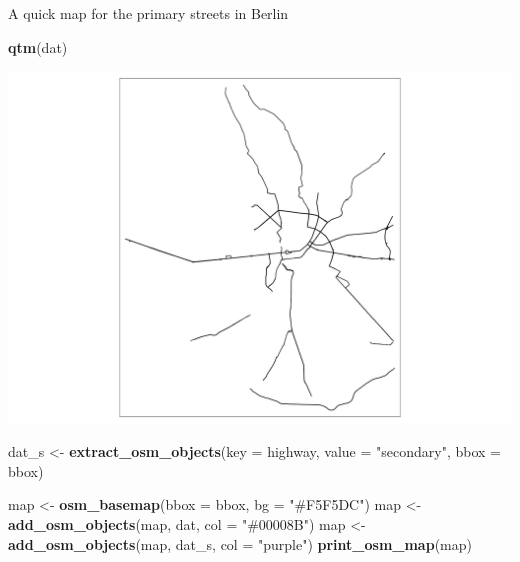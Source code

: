 \documentclass[
  ignorenonframetext,
]{beamer}
\newenvironment{Shaded}{\begin{snugshade}}{\end{snugshade}}
\newcommand{\DataTypeTok}[1]{\textcolor[rgb]{0.13,0.29,0.53}{#1}}
\newcommand{\KeywordTok}[1]{\textcolor[rgb]{0.13,0.29,0.53}{\textbf{#1}}}
\newcommand{\NormalTok}[1]{#1}
\newcommand{\StringTok}[1]{\textcolor[rgb]{0.31,0.60,0.02}{#1}}
\begin{document}
\begin{frame}[fragile]{A quick map for the primary streets in Berlin}
\protect\hypertarget{a-quick-map-for-the-primary-streets-in-berlin}{}
\begin{Shaded}
\begin{Highlighting}[]
\KeywordTok{qtm}\NormalTok{(dat)}
\end{Highlighting}
\end{Shaded}

\includegraphics{quick_high_quality_maps_files/figure-beamer/unnamed-chunk-37-1.pdf}
\end{frame}

\begin{frame}[fragile]{}
\protect\hypertarget{section}{}
\begin{Shaded}
\begin{Highlighting}[]
\NormalTok{dat\_s \textless{}{-}}\StringTok{ }\KeywordTok{extract\_osm\_objects}\NormalTok{(}\DataTypeTok{key =} \StringTok{\textquotesingle{}highway\textquotesingle{}}\NormalTok{,}
                           \DataTypeTok{value =} \StringTok{"secondary"}\NormalTok{,}
                           \DataTypeTok{bbox =}\NormalTok{ bbox)}
\end{Highlighting}
\end{Shaded}

\begin{Shaded}
\begin{Highlighting}[]
\NormalTok{map \textless{}{-}}\StringTok{ }\KeywordTok{osm\_basemap}\NormalTok{(}\DataTypeTok{bbox =}\NormalTok{ bbox, }\DataTypeTok{bg =} \StringTok{"\#F5F5DC"}\NormalTok{)}
\NormalTok{map \textless{}{-}}\StringTok{ }\KeywordTok{add\_osm\_objects}\NormalTok{(map, dat, }\DataTypeTok{col =} \StringTok{"\#00008B"}\NormalTok{)}
\NormalTok{map \textless{}{-}}\StringTok{ }\KeywordTok{add\_osm\_objects}\NormalTok{(map, dat\_s, }\DataTypeTok{col =} \StringTok{"purple"}\NormalTok{)}
\KeywordTok{print\_osm\_map}\NormalTok{(map)}
\end{Highlighting}
\end{Shaded}
\end{frame}
\end{document}
